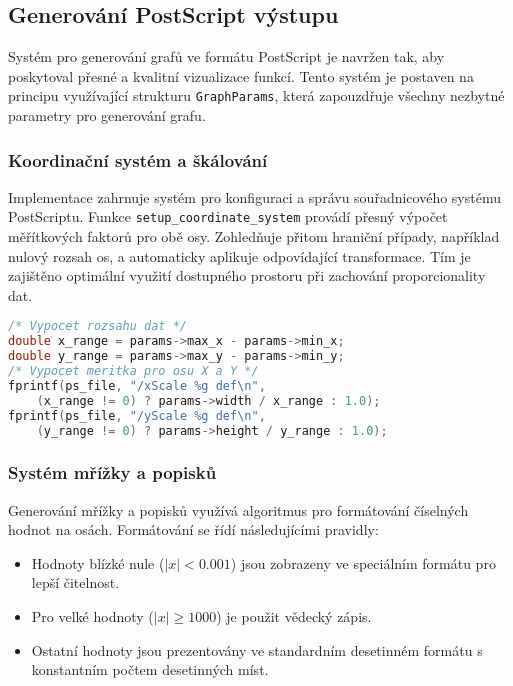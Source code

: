 \documentclass[12pt]{article} %
\begin{document}
\subsection{Generování PostScript výstupu}

Systém pro generování grafů ve formátu PostScript je navržen tak, aby poskytoval přesné a kvalitní vizualizace funkcí. Tento systém je postaven na principu využívající strukturu \texttt{GraphParams}, která zapouzdřuje všechny nezbytné parametry pro generování grafu.

\subsubsection{Koordinační systém a škálování}

Implementace zahrnuje systém pro konfiguraci a správu souřadnicového systému PostScriptu. Funkce \texttt{setup\_coordinate\_system} provádí přesný výpočet měřítkových faktorů pro obě osy. Zohledňuje přitom hraniční případy, například nulový rozsah os, a automaticky aplikuje odpovídající transformace. Tím je zajištěno optimální využití dostupného prostoru při zachování proporcionality dat.
\begin{lstlisting}[language=C, caption=Nastavení koordinačního systému]
/* Vypocet rozsahu dat */
double x_range = params->max_x - params->min_x;
double y_range = params->max_y - params->min_y;
/* Vypocet meritka pro osu X a Y */    
fprintf(ps_file, "/xScale %g def\n", 
    (x_range != 0) ? params->width / x_range : 1.0);
fprintf(ps_file, "/yScale %g def\n", 
    (y_range != 0) ? params->height / y_range : 1.0);
\end{lstlisting}

\subsubsection{Systém mřížky a popisků}

Generování mřížky a popisků využívá algoritmus pro formátování číselných hodnot na osách. Formátování se řídí následujícími pravidly:
\begin{itemize}
\item Hodnoty blízké nule ($|x| < 0.001$) jsou zobrazeny ve speciálním formátu pro lepší čitelnost.
\item Pro velké hodnoty ($|x| \geq 1000$) je použit vědecký zápis.
\item Ostatní hodnoty jsou prezentovány ve standardním desetinném formátu s konstantním počtem desetinných míst.
\end{itemize}
\end{document}
